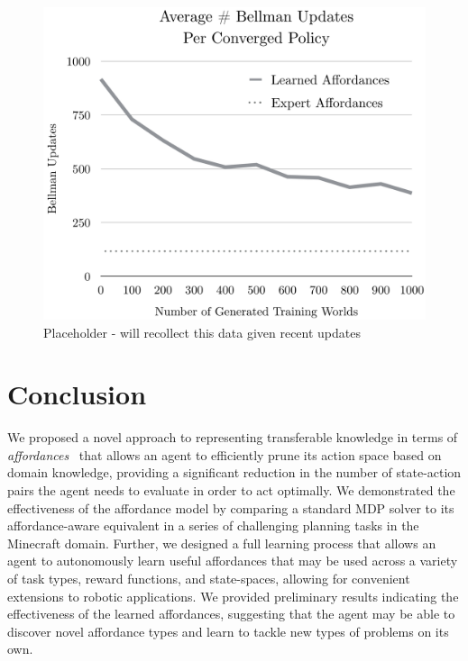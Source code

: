 \documentclass[conference]{IEEEtran}
\begin{document}
\begin{figure}[H]
\centering
\includegraphics[scale=0.195]{figures/training_results.png}%
  \caption{Placeholder - will recollect this data given recent updates}
  \label{fig:training_results}
\end{figure}

\section{Conclusion}
\label{sec:conclusion}

We proposed a novel approach to representing transferable knowledge in terms of
{\em affordances}~\cite{gibson77} that allows an agent to efficiently
prune its action space based on domain knowledge,
providing a significant reduction in the number of state-action pairs the
agent needs to evaluate in order to act optimally. We demonstrated the effectiveness of the affordance model by comparing a standard MDP solver
to its affordance-aware equivalent in a series of challenging planning tasks in the Minecraft
domain. Further, we designed a full learning process that allows an agent to autonomously learn useful affordances that may be used
across a variety of task types, reward functions, and state-spaces, allowing for convenient extensions to robotic applications.
We provided preliminary results indicating the effectiveness of the learned affordances, suggesting that
the agent may be able to discover novel affordance types and learn to tackle new types of problems on its own.
\end{document}
